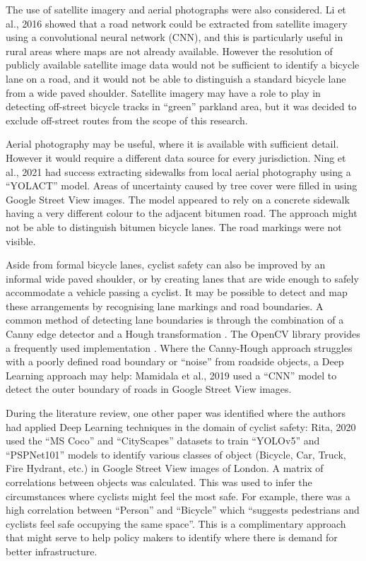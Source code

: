 \documentclass[11pt,twoside]{report}
\begin{document}
The use of satellite imagery and aerial photographs were also considered.  Li et al., 2016 \cite{ROADNETWORK} showed that a road network could be extracted from satellite imagery using a convolutional neural network (CNN), and this is particularly useful in rural areas where maps are not already available.  However the resolution of publicly available satellite image data would not be sufficient to identify a bicycle lane on a road, and it would not be able to distinguish a standard bicycle lane from a wide paved shoulder.  Satellite imagery may have a role to play in detecting off-street bicycle tracks in ``green'' parkland area, but it was decided to exclude off-street routes from the scope of this research.

Aerial photography may be useful, where it is available with sufficient detail.  However it would require a different data source for every jurisdiction.  Ning et al., 2021 \cite{NING2021} had success extracting sidewalks from local aerial photography using a ``YOLACT'' model.  Areas of uncertainty caused by tree cover were filled in using Google Street View images.  The model appeared to rely on a concrete sidewalk having a very different colour to the adjacent bitumen road.  The approach might not be able to distinguish bitumen bicycle lanes.  The road markings were not visible.

Aside from formal bicycle lanes, cyclist safety can also be improved by an informal wide paved shoulder, or by creating lanes that are wide enough to safely accommodate a vehicle passing a cyclist.  It may be possible to detect and map these arrangements by recognising lane markings and road boundaries.  A common method of detecting lane boundaries is through the combination of a Canny edge detector \cite{canny} and a Hough transformation \cite{hough}.  The OpenCV library provides a frequently used implementation \cite{opencv}.  Where the Canny-Hough approach struggles with a poorly defined road boundary or ``noise'' from roadside objects, a Deep Learning approach may help:  Mamidala et al., 2019 \cite{8929655} used a ``CNN'' model to detect the outer boundary of roads in Google Street View images.

During the literature review, one other paper was identified where the authors had applied Deep Learning techniques in the domain of cyclist safety:  Rita, 2020 \cite{rita_2020} used the ``MS Coco'' and ``CityScapes'' datasets to train ``YOLOv5'' and ``PSPNet101'' models to identify various classes of object (Bicycle, Car, Truck, Fire Hydrant, etc.) in Google Street View images of London.  A matrix of correlations between objects was calculated.  This was used to infer the circumstances where cyclists might feel the most safe.  For example, there was a high correlation between ``Person'' and ``Bicycle'' which ``suggests pedestrians and cyclists feel safe occupying the same space''.  This is a complimentary approach that might serve to help policy makers to identify where there is demand for better infrastructure.
\end{document}
